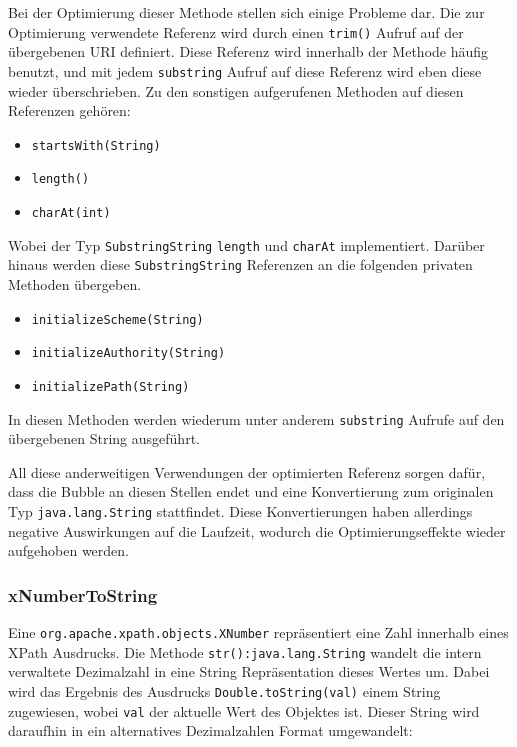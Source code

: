 Bei der Optimierung dieser Methode stellen sich einige Probleme dar. Die zur 
Optimierung verwendete Referenz wird durch einen \texttt{trim()} Aufruf auf der
übergebenen URI definiert. Diese Referenz wird innerhalb der Methode häufig benutzt,
und mit jedem \texttt{substring} Aufruf auf diese Referenz wird eben diese wieder 
überschrieben. Zu den sonstigen aufgerufenen Methoden auf diesen Referenzen gehören:

\begin{itemize}
  	\item \texttt{startsWith(String)}
  	\item \texttt{length()}
  	\item \texttt{charAt(int)} 
\end{itemize}  

Wobei der Typ \texttt{SubstringString} \texttt{length} und \texttt{charAt} 
implementiert. Darüber hinaus werden diese \texttt{SubstringString} Referenzen
an die folgenden privaten Methoden übergeben. 

\begin{itemize}
 	\item \texttt{initializeScheme(String)}
 	\item \texttt{initializeAuthority(String)}
 	\item \texttt{initializePath(String)}
\end{itemize} 

In diesen Methoden werden wiederum unter anderem \texttt{substring} Aufrufe auf 
den übergebenen String ausgeführt.

All diese anderweitigen Verwendungen der optimierten Referenz sorgen dafür, dass die
Bubble an diesen Stellen endet und eine Konvertierung zum originalen Typ 
\texttt{java.lang.String} stattfindet. Diese Konvertierungen haben allerdings negative 
Auswirkungen auf die Laufzeit, wodurch die Optimierungseffekte wieder aufgehoben werden.    

\subsubsection{xNumberToString}

Eine \texttt{org.apache.xpath.objects.XNumber} repräsentiert eine Zahl innerhalb eines
XPath Ausdrucks. Die Methode \texttt{str():java.lang.String} wandelt die intern verwaltete
Dezimalzahl in eine String Repräsentation dieses Wertes um. Dabei wird das Ergebnis
des Ausdrucks \texttt{Double.toString(val)} einem String zugewiesen, wobei \texttt{val} 
der aktuelle Wert des Objektes ist. Dieser String wird daraufhin in ein alternatives
Dezimalzahlen Format umgewandelt: 

